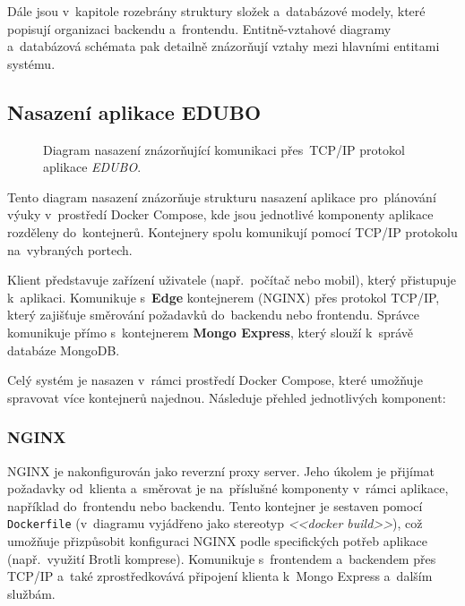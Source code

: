 \documentclass[male,czech,api_bc]{kitheses}
\begin{document}
Dále jsou v~kapitole rozebrány struktury složek a~databázové modely, které popisují organizaci backendu a~frontendu. Entitně-vztahové diagramy a~databázová schémata pak detailně znázorňují vztahy mezi hlavními entitami systému.

\subsection{Nasazení aplikace EDUBO}

\begin{figure}[H]
	\centering
	\caption{Diagram nasazení znázorňující komunikaci přes~TCP/IP protokol aplikace \textit{EDUBO}.}
	\label{fig:deployment-diagram-1}
\end{figure}

Tento diagram nasazení znázorňuje strukturu nasazení aplikace pro~plánování výuky v~prostředí Docker Compose, kde jsou jednotlivé komponenty aplikace rozděleny do~kontejnerů. Kontejnery spolu komunikují pomocí TCP/IP protokolu na~vybraných portech.

Klient představuje zařízení uživatele (např.~počítač nebo mobil), který přistupuje k~aplikaci. Komunikuje s~\textbf{Edge} kontejnerem (NGINX) přes protokol TCP/IP, který zajišťuje směrování požadavků do~backendu nebo frontendu. Správce komunikuje přímo s~kontejnerem \textbf{Mongo Express}, který slouží k~správě databáze MongoDB.

Celý systém je nasazen v~rámci prostředí Docker Compose, které umožňuje spravovat více kontejnerů najednou. Následuje přehled jednotlivých komponent:

\subsubsection{NGINX}
NGINX je nakonfigurován jako reverzní proxy server. Jeho úkolem je přijímat požadavky od~klienta a~směrovat je na~příslušné komponenty v~rámci aplikace, například do~frontendu nebo backendu. Tento kontejner je sestaven pomocí \texttt{Dockerfile} (v~diagramu vyjádřeno jako stereotyp \textit{<<docker build>>}), což umožňuje přizpůsobit konfiguraci NGINX podle specifických potřeb aplikace (např.~využití Brotli komprese). Komunikuje s~frontendem a~backendem přes TCP/IP a~také zprostředkovává připojení klienta k~Mongo Express a~dalším službám.
\end{document}
